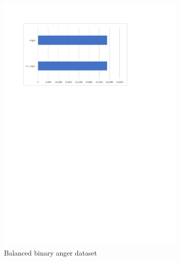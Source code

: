 \begin{figure}[!htp]
  \center
  \begin{subfigure}[b]{0.5\textwidth}
    \includegraphics[width=\linewidth]{figures/binary_anger_dataset_distribution}
    \caption{Balanced binary anger dataset}
    \label{fig:binary_anger_dataset_distribution}
  \end{subfigure}%
  \begin{subfigure}[b]{0.5\textwidth}

\end{subfigure}
\end{figure}
